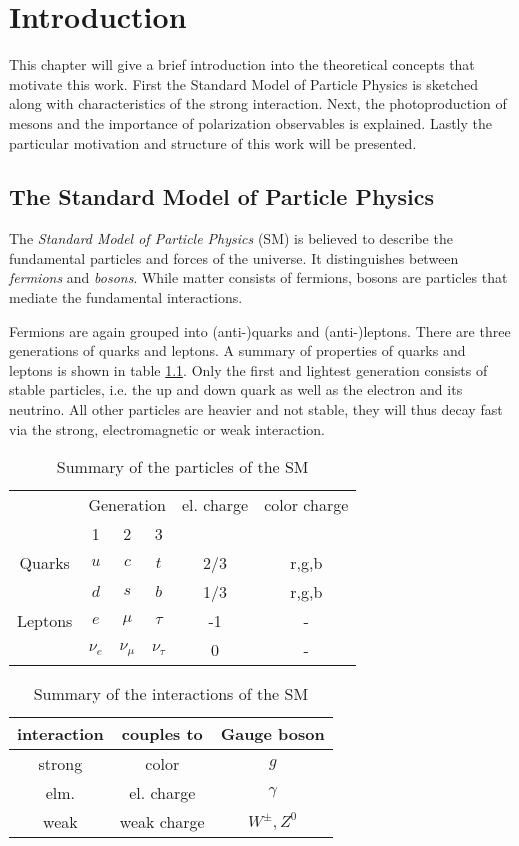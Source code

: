 
\chapter{Introduction}
\label{sec:intro}
This chapter will give a brief introduction into the theoretical concepts that motivate this work. First the Standard Model of Particle Physics is sketched along with characteristics of the strong interaction. Next, the photoproduction of mesons and the importance of polarization observables is explained. Lastly the particular motivation and structure of this work will be presented.
\section{The Standard Model of Particle Physics}
The \emph{Standard Model of Particle Physics} (SM) is believed to describe the fundamental particles and forces of the universe. It distinguishes between \emph{fermions} and \emph{bosons}. While matter consists of fermions, bosons are particles that mediate the fundamental interactions. 

Fermions are again grouped into (anti-)quarks and (anti-)leptons. There are three generations of quarks and leptons. A summary of properties of quarks and leptons is shown in table \ref{tab:sm0}. Only the first and lightest generation consists of stable particles, i.e. the up and down quark as well as the electron and its neutrino. All other particles are heavier and not stable, they will thus decay fast via the strong, electromagnetic or weak interaction.
\begin{table}[htbp]
	\centering
	\begin{tabular}{cccccc}
		\toprule
		&\multicolumn{3}{c}{Generation}&el. charge&color charge\\
		&1 & 2 & 3 & & \\
		\hline
		Quarks & $u$&$c$&$t$& 2/3 & r,g,b\\
		&$d$&$s$&$b$& 1/3 & r,g,b\\
		Leptons& $e$&$\mu$&$\tau$&-1& -\\
		& $\nu_e$&$\nu_\mu$&$\nu_\tau$&0&-\\
		\bottomrule
		
	\end{tabular}
\caption{Summary of the particles of the SM}
\label{tab:sm0}
\end{table}
\begin{table}[htbp]
	\centering
	\begin{tabular}{ccc}
		\toprule
		interaction & couples to & Gauge boson\\
		\hline
		strong & color & $g$\\
		elm.& el. charge & $\gamma$\\
		weak&weak charge & $W^\pm,Z^0$\\
		\bottomrule
	\end{tabular}
	
	\caption{Summary of the interactions of the SM}
	\label{tab:sm1}
\end{table}


